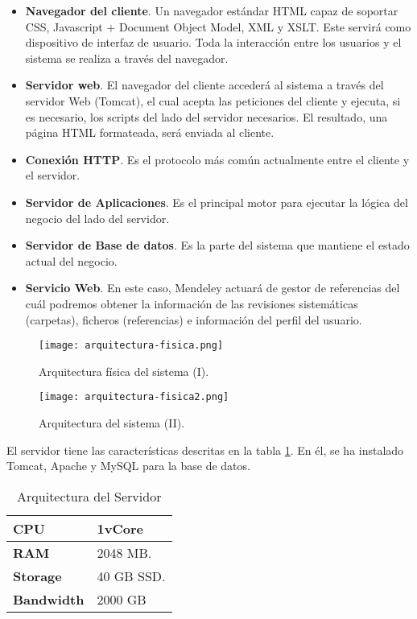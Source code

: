 \begin{itemize}
	\item \textbf{Navegador del cliente}. Un navegador estándar HTML capaz de soportar  CSS, Javascript + Document Object Model, XML y XSLT. Este servirá como dispositivo de interfaz de usuario. Toda la interacción entre los usuarios y el sistema se realiza a través del navegador.
	\item \textbf{Servidor web}. El navegador del cliente accederá al sistema a través del servidor Web (Tomcat), el cual acepta las peticiones del cliente y ejecuta, si es necesario, los scripts del lado del servidor necesarios. El resultado, una página HTML formateada, será enviada al cliente.
	\item \textbf{Conexión HTTP}. Es el protocolo más común actualmente entre el cliente y el servidor.
	\item \textbf{Servidor de Aplicaciones}. Es el principal motor para ejecutar la lógica del negocio del lado del servidor.
	\item \textbf{Servidor de Base de datos}. Es la parte del sistema que mantiene el estado actual del negocio.
	\item \textbf{Servicio Web}. En este caso, Mendeley actuará de gestor de referencias del cuál podremos obtener la información de las revisiones sistemáticas (carpetas), ficheros (referencias) e información del perfil del usuario.
\end{itemize}

\begin{figure}[!hpt]
	\begin{center} 
		\texttt{[image: arquitectura-fisica.png]}
		\caption{Arquitectura física del sistema (I).}
		\label{fig:arquitectura-fisica01}
	\end{center}
\end{figure}

\begin{figure}[!hpt]
	\begin{center} 
		\texttt{[image: arquitectura-fisica2.png]}
		\caption{Arquitectura del sistema (II).}
		\label{fig:arquitectura-fisica02}
	\end{center}
\end{figure}

El servidor tiene las características descritas en la tabla \ref{table:arqui-server}. En él, se ha instalado Tomcat, Apache y MySQL para la base de datos.

\begin{table}[!hbt]
	\begin{center}
		\begin{tabular}{|p{4cm}|p{11cm}|}
			\hline
			\textbf{CPU} & 1vCore\\
			\hline
			\textbf{RAM} & 2048 MB.\\
			\hline
			\textbf{Storage} & 40 GB SSD.\\
			\hline
			\textbf{Bandwidth} & 2000 GB\\
			\hline
		\end{tabular}
		\caption{Arquitectura del Servidor}
		\label{table:arqui-server}
	\end{center}
\end{table}

